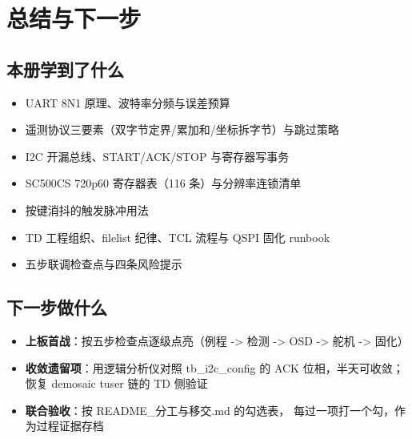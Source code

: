 \documentclass[11pt]{ctexart}
\begin{document}
\section*{总结与下一步}

\subsection*{本册学到了什么}
\begin{itemize}
  \item UART 8N1 原理、波特率分频与误差预算
  \item 遥测协议三要素（双字节定界/累加和/坐标拆字节）与跳过策略
  \item I2C 开漏总线、START/ACK/STOP 与寄存器写事务
  \item SC500CS 720p60 寄存器表（116 条）与分辨率连锁清单
  \item 按键消抖的触发脉冲用法
  \item TD 工程组织、filelist 纪律、TCL 流程与 QSPI 固化 runbook
  \item 五步联调检查点与四条风险提示
\end{itemize}

\subsection*{下一步做什么}
\begin{itemize}
  \item \textbf{上板首战}：按五步检查点逐级点亮（例程 -> 检测 ->
    OSD -> 舵机 -> 固化）
  \item \textbf{收敛遗留项}：用逻辑分析仪对照 tb\_i2c\_config 的
    ACK 位相，半天可收敛；恢复 demosaic tuser 链的 TD 侧验证
  \item \textbf{联合验收}：按 README\_分工与移交.md 的勾选表，
    每过一项打一个勾，作为过程证据存档
\end{itemize}
\end{document}
